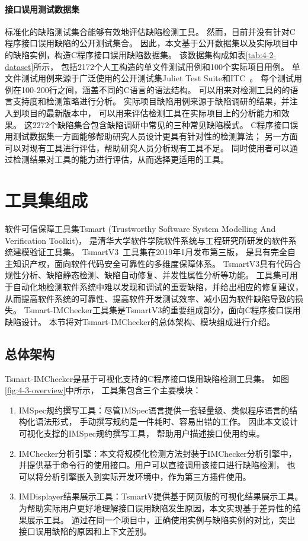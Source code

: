 \paragraph{接口误用测试数据集}
标准化的缺陷测试集合能够有效地评估缺陷检测工具。
然而，目前并没有针对C程序接口误用缺陷的公开测试集合。
因此，本文基于公开数据集以及实际项目中的缺陷实例，构造C程序接口误用缺陷数据集。
该数据集构成如表\ref{tab:4-2-dataset}所示，
包括2172个人工构造的单文件测试用例和100个实际项目用例。
单文件测试用例来源于广泛使用的公开测试集Juliet Test Suite和ITC~\cite{itc}。
每个测试用例在100-200行之间，涵盖不同的C语言的语法结构。
可以用来对检测工具的的语言支持度和检测策略进行分析。
实际项目缺陷用例来源于缺陷调研的结果，并注入到项目的最新版本中，
可以用来评估检测工具在实际项目上的分析能力和效果。
这2272个缺陷集合包含缺陷调研中常见的三种常见缺陷模式。
C程序接口误用测试数据集一方面能够帮助研究人员设计更具有针对性的检测算法；
另一方面可以对现有工具进行评估，帮助研究人员分析现有工具不足。
同时使用者可以通过检测结果对工具的能力进行评估，从而选择更适用的工具。


\section{工具集组成}
\label{sec:4.3}
软件可信保障工具集Tsmart (Trustworthy Software System Modelling And Verification Toolkit)，
是清华大学软件学院软件系统与工程研究所研发的软件系统建模验证工具集。
TsmartV3~\cite{tsmart}工具集在2019年1月发布第三版，
是具有完全自主知识产权，面向软件代码安全可靠性的多维度保障体系。
TsmartV3具有代码合规性分析、缺陷静态检测、缺陷自动修复、并发性属性分析等功能。
工具集可用于自动化地检测软件系统中难以发现和调试的重要缺陷，并给出相应的修复建议，
从而提高软件系统的可靠性、提高软件开发测试效率、减小因为软件缺陷导致的损失。
Tsmart-IMChecker工具集是TsmartV3的重要组成部分，面向C程序接口误用缺陷设计。
本节将对Tsmart-IMChecker的总体架构、模块组成进行介绍。

\subsection{总体架构}
Tsmart-IMChecker是基于可视化支持的C程序接口误用缺陷检测工具集。
如图\ref{fig:4-3-overview}中所示，
工具集包含三个主要模块：
\begin{enumerate}
	\item IMSpec规约撰写工具：尽管IMSpec语言提供一套轻量级、类似程序语言的结构化语法形式，
	手动撰写规约是一件耗时、容易出错的工作。
	因此本文设计可视化支撑的IMSpec规约撰写工具，
	帮助用户描述接口使用约束。
	\item IMChecker分析引擎：本文将规模化检测方法封装于IMChecker分析引擎中，
	并提供基于命令行的使用接口。用户可以直接调用该接口进行缺陷检测，
	也可以将分析引擎嵌入到实际开发环境中，作为第三方插件使用。
	\item IMDisplayer结果展示工具：TsmartV提供基于网页版的可视化结果展示工具。
	为帮助实际用户更好地理解接口误用缺陷发生原因，本文实现基于差异性的结果展示工具。
	通过在同一个项目中，正确使用实例与缺陷实例的对比，突出接口误用缺陷的原因和上下文差别。
\end{enumerate}

